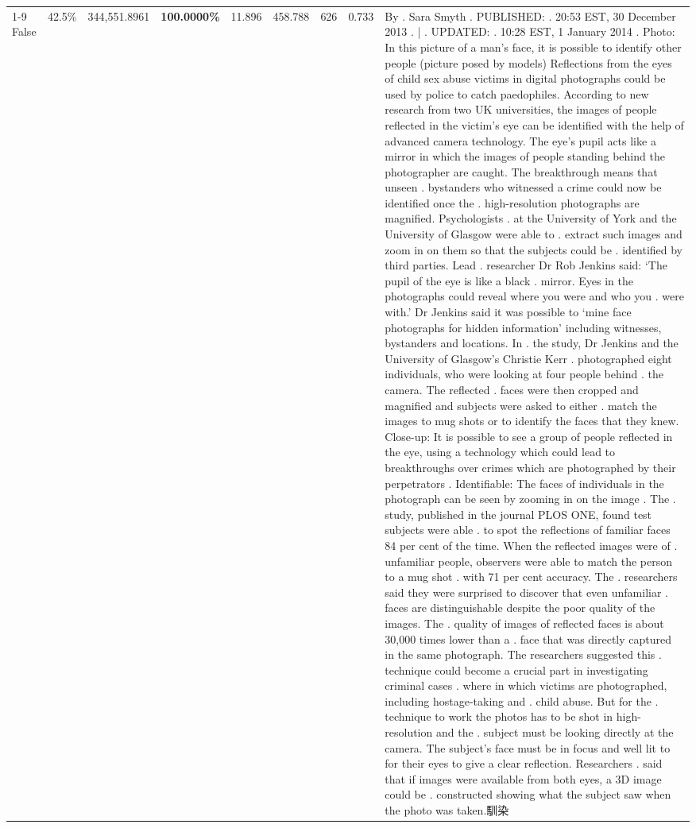 \begin{table}[H]
\begin{tabular}{lllrlllll}
\cline{1-9}
False & 42.5\% & 344,551.8961 & \bfseries \color{red} 100.0000\% & 11.896 & 458.788 & 626 & 0.733 & By . Sara Smyth . PUBLISHED: . 20:53 EST, 30 December 2013 . | . UPDATED: . 10:28 EST, 1 January 2014 . Photo: In this picture of a man's face, it is possible to identify other people (picture posed by models) Reflections from the eyes of child sex abuse victims in digital photographs could be used by police to catch paedophiles. According to new research from two UK universities, the images of people reflected in the victim's eye can be identified with the help of advanced camera technology. The eye's pupil acts like a mirror in which the images of people standing behind the photographer are caught. The breakthrough means that unseen . bystanders who witnessed a crime could now be identified once the . high-resolution photographs are magnified. Psychologists . at the University of York and the University of Glasgow were able to . extract such images and zoom in on them so that the subjects could be . identified by third parties. Lead . researcher Dr Rob Jenkins said: ‘The pupil of the eye is like a black . mirror. Eyes in the photographs could reveal where you were and who you . were with.' Dr Jenkins said it was possible to ‘mine face photographs for hidden information' including witnesses, bystanders and locations. In . the study, Dr Jenkins and the University of Glasgow's Christie Kerr . photographed eight individuals, who were looking at four people behind . the camera. The reflected . faces were then cropped and magnified and subjects were asked to either . match the images to mug shots or to identify the faces that they knew. Close-up: It is possible to see a group of people reflected in the eye, using a technology which could lead to breakthroughs over crimes which are photographed by their perpetrators . Identifiable: The faces of individuals in the photograph can be seen by zooming in on the image . The . study, published in the journal PLOS ONE, found test subjects were able . to spot the reflections of familiar faces 84 per cent of the time. When the reflected images were of . unfamiliar people, observers were able to match the person to a mug shot . with 71 per cent accuracy. The . researchers said they were surprised to discover that even unfamiliar . faces are distinguishable despite the poor quality of the images. The . quality of images of reflected faces is about 30,000 times lower than a . face that was directly captured in the same photograph. The researchers suggested this . technique could become a crucial part in investigating criminal cases . where in which victims are photographed, including hostage-taking and . child abuse. But for the . technique to work the photos has to be shot in high-resolution and the . subject must be looking directly at the camera. The subject's face must be in focus and well lit to for their eyes to give a clear reflection. Researchers . said that if images were available from both eyes, a 3D image could be . constructed showing what the subject saw when the photo was taken.馴染 \\

\end{tabular}
\end{table}
